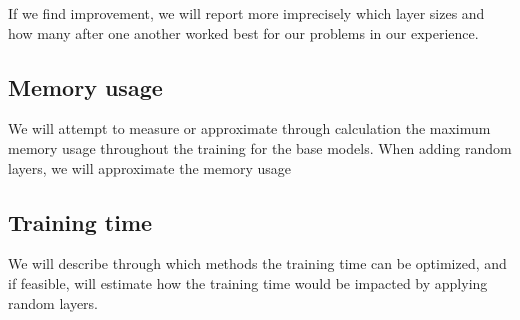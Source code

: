 \documentclass[]{article}
\begin{document}
\begin{multicols}{2}
	If we find improvement, we will report more imprecisely which layer sizes and how many after one another worked best for our problems in our experience.
	
	\subsection{Memory usage}
	We will attempt to measure or approximate through calculation the maximum memory usage throughout the training for the base models. When adding random layers, we will approximate the memory usage
	
	\subsection{Training time}
	We will describe through which methods the training time can be optimized, and if feasible, will estimate how the training time would be impacted by applying random layers.
\end{multicols}
\end{document}
